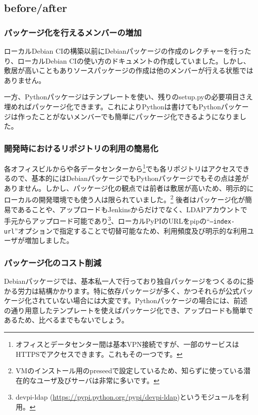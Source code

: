 \documentclass[mingoth,a4paper]{jsarticle}
\begin{document}
\subsection{before/after}

\subsubsection{パッケージ化を行えるメンバーの増加}
ローカルDebian CIの構築以前にDebianパッケージの作成のレクチャーを行ったり、ローカルDebian CIの使い方のドキュメントの作成していました。しかし、敷居が高いこともありソースパッケージの作成は他のメンバーが行える状態ではありません。

一方、Pythonパッケージはテンプレートを使い、残りのsetup.pyの必要項目さえ埋めればパッケージ化できます。これによりPythonは書けてもPythonパッケージは作ったことがないメンバーでも簡単にパッケージ化できるようになりました。

\subsubsection{開発時におけるリポジトリの利用の簡易化}
各オフィスビルからや各データセンターから\footnote{オフィスとデータセンター間は基本VPN接続ですが、一部のサービスはHTTPSでアクセスできます。これもその一つです。}でも各リポジトリはアクセスできるので、基本的にはDebianパッケージでもPythonパッケージでもその点は差がありません。しかし、パッケージ化の観点では前者は敷居が高いため、明示的にローカルの開発環境でも使う人は限られていました。\footnote{VMのインストール用のpreseedで設定しているため、知らずに使っている潜在的なユーザ及びサーバは非常に多いです。}
後者はパッケージ化が簡易であることや、アップロードもJenkinsからだけでなく、LDAPアカウントで手元からアップロード可能であり\footnote{devpi-ldap (\url{https://pypi.python.org/pypi/devpi-ldap})というモジュールを利用。}、ローカルPyPIのURLをpipの``\texttt{--index-url}''オプションで指定することで切替可能なため、利用頻度及び明示的な利用ユーザが増加しました。

\subsubsection{パッケージ化のコスト削減}

Debianパッケージでは、基本私一人で行っており独自パッケージをつくるのに掛かる労力は結構かかります。特に依存パッケージが多く、かつそれらが公式パッケージ化されていない場合には大変です。Pythonパッケージの場合には、前述の通り用意したテンプレートを使えばパッケージ化でき、アップロードも簡単であるため、比べるまでもないでしょう。
\end{document}
